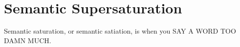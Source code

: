 \section{Semantic Supersaturation}

Semantic saturation, or semantic satiation, is when you SAY A WORD TOO DAMN MUCH.
